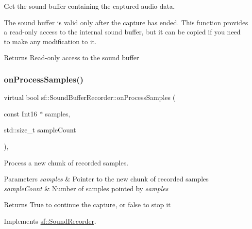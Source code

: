 Get the sound buffer containing the captured audio data. 

The sound buffer is valid only after the capture has ended. This function provides a read-\/only access to the internal sound buffer, but it can be copied if you need to make any modification to it.

\begin{DoxyReturn}{Returns}
Read-\/only access to the sound buffer 
\end{DoxyReturn}
\mbox{\label{classsf_1_1_sound_buffer_recorder_a9ceb94de14632ae8c1b78faf603b4767}} 
\subsubsection{\texorpdfstring{on\+Process\+Samples()}{onProcessSamples()}}
{\footnotesize\ttfamily virtual bool sf\+::\+Sound\+Buffer\+Recorder\+::on\+Process\+Samples (\begin{DoxyParamCaption}\item[{const Int16 $\ast$}]{samples,  }\item[{std\+::size\+\_\+t}]{sample\+Count }\end{DoxyParamCaption})\hspace{0.3cm}{\ttfamily [protected]}, {\ttfamily [virtual]}}



Process a new chunk of recorded samples. 


\begin{DoxyParams}{Parameters}
{\em samples} & Pointer to the new chunk of recorded samples \\
\hline
{\em sample\+Count} & Number of samples pointed by {\itshape samples} \\
\hline
\end{DoxyParams}
\begin{DoxyReturn}{Returns}
True to continue the capture, or false to stop it 
\end{DoxyReturn}


Implements \hyperlink{classsf_1_1_sound_recorder_a2670124cbe7a87c7e46b4840807f4fd7}{sf\+::\+Sound\+Recorder}.

\mbox{\label{classsf_1_1_sound_buffer_recorder_a531a7445fc8a48eaf9fc039c83f17c6f}} 
